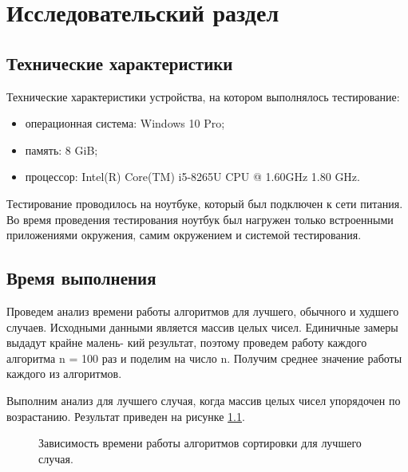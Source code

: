 \chapter{Исследовательский раздел}
\section{Технические характеристики}
Технические характеристики устройства, на котором выполнялось тестирование:
\begin{itemize}
	\item операционная система: Windows 10 Pro;
	\item память: 8 GiB;
	\item процессор: Intel(R) Core(TM) i5-8265U CPU @ 1.60GHz   1.80 GHz.
\end{itemize}
Тестирование проводилось на ноутбуке, который был подключен к сети питания. Во время проведения тестирования ноутбук был нагружен только встроенными приложениями окружения, самим окружением и системой тестирования.

\section{Время выполнения}
Проведем анализ времени работы алгоритмов для лучшего, обычного и худшего случаев. Исходными
данными является массив целых чисел. Единичные замеры выдадут крайне малень-
кий результат, поэтому проведем работу каждого алгоритма n = 100 раз
и поделим на число n. Получим среднее значение работы каждого из
алгоритмов.

Выполним анализ для лучшего случая, когда массив целых чисел упорядочен по возрастанию. Результат приведен на рисунке \ref{fg:ref1}.

\begin{figure}[H]
	\centering
	\caption{Зависимость времени работы алгоритмов сортировки для лучшего случая.} 
	\label{fg:ref1}
\end{figure} 


